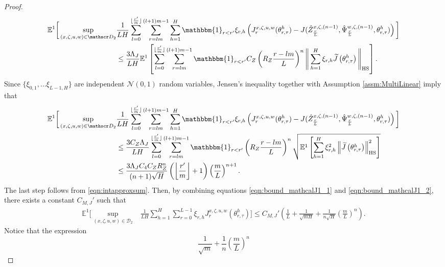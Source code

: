 \documentclass{article}
\begin{document}
\begin{appendices}
\begin{proof}
\begin{align*}
        \mathbb E^1 \bigg[\sup_{(x,\zeta,u ,w )\in \mathscr D_2}& \frac{1}{LH}\sum_{l=0}^{\lfloor \frac{r'}{m}\rfloor}\sum_{r=lm}^{(l+1)m-1}\sum_{h=1}^H \mathbbm{1}_{r<r'}\xi_{r,h}\left(J^{x,\zeta,u,w}_{r}(\theta^h_{r,\tau})-J(\hat Z^{x,\zeta,(n-1)}_\frac{r}{L},\hat \Psi^{w,\zeta,(n-1)}_\frac{r}{L},\theta^h_{r,\tau})\right)\bigg]\notag\\
        & \le \frac{3\Lambda_J}{LH}\mathbb E^1 \left[\sum_{l=0}^{\lfloor \frac{r'}{m}\rfloor}\sum_{r=lm}^{(l+1)m-1} \mathbbm{1}_{r<r'}C_Z \left(R_Z \frac{r-lm}{L} \right)^n\Bigg\Vert \sum_{h=1}^H \xi_{r,h}\widetilde J\left(\theta^h_{r,\tau}\right)\Bigg\Vert_\mathrm{HS} \right].
\end{align*}
Since $\{\xi_{0,1},\ldots \xi_{L-1,H}\}$ are independent $\mathcal N(0,1)$ random variables, Jensen's inequality together with Assumption \ref{assm:MultiLinear} imply that
\begin{align}
        \mathbb E^1 \bigg[\sup_{(x,\zeta,u ,w )\in \mathscr D_2}& \frac{1}{LH}\sum_{l=0}^{\lfloor \frac{r'}{m}\rfloor}\sum_{r=lm}^{(l+1)m-1}\sum_{h=1}^H \mathbbm{1}_{r<r'}\xi_{r,h}\left(J^{x,\zeta,u,w}_{r}(\theta^h_{r,\tau})-J(\hat Z^{x,\zeta,(n-1)}_\frac{r}{L},\hat \Psi^{w,\zeta,(n-1)}_\frac{r}{L},\theta^h_{r,\tau})\right)\bigg]\notag\\
        &  \le \frac{3C_Z \Lambda_J}{LH}\sum_{l=0}^{\lfloor \frac{r'}{m}\rfloor}\sum_{r=lm}^{(l+1)m-1}\mathbbm{1}_{r<r'}\left(R_Z\frac{r-lm}{L} \right)^{n} \sqrt{\mathbb E^1\left[  \sum_{h=1}^H \xi_{r,h}^2\left\Vert \widetilde J\left(\theta^h_{r,\tau}\right)\right\Vert_\mathrm{HS}^{2} \right]}\notag\\
        & \le \frac{3\Lambda_J C_4 C_Z R_Z^{n}}{(n+1)\sqrt{H}}\left(\left\lfloor \frac{r'}{m}\right\rfloor +1\right)\left(\frac{m}{L} \right)^{n+1}.\label{eqn:bound_mathcalJ1_2}
\end{align} 
The last step follows from \eqref{eqn:intapproxsum}. Then, by combining equations \eqref{eqn:bound_mathcalJ1_1} and \eqref{eqn:bound_mathcalJ1_2},
there exists a constant $C_{M,J}'$ such that
\begin{align}\label{eqn:EsupJ1final}
    \mathbb E^1 \bigg[\sup_{(x,\zeta,u ,w)\in \mathscr D_2}&\frac{1}{LH}\sum_{h=1}^H \sum_{r=0}^{L-1}\xi_{r,h}J^{x,\zeta,u,w}_r(\theta^h_{r,\tau})\bigg] \le C_{M,J}'\left( \frac{1}{L}+\frac{1}{ \sqrt {mH}}+ \frac{1}{n\sqrt{H}}\left(\frac{m}{L} \right)^{n}\right).
\end{align}
Notice that the expression
\[
\frac{1}{\sqrt{m}}+ \frac{1}{n}\left( \frac{m}{L}\right)^{n}
\]
\end{proof}
\end{appendices}
\end{document}
